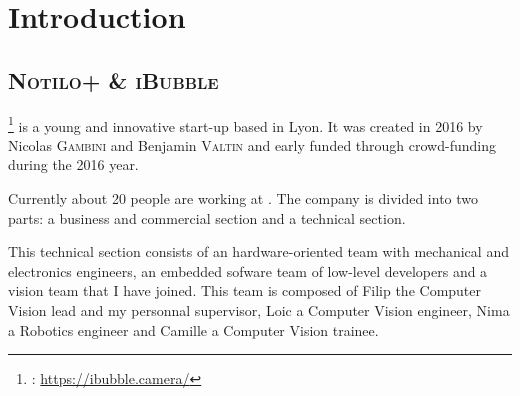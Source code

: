 
\chapter{Introduction} %

\label{Introduction} %


\newcommand{\keyword}[1]{\textbf{#1}}
\newcommand{\tabhead}[1]{\textbf{#1}}
\newcommand{\code}[1]{\texttt{\hl{#1}}}
\newcommand{\file}[1]{\texttt{\bfseries#1}}
\newcommand{\option}[1]{\texttt{\itshape#1}}
\newcommand{\iBubble}{\textsc{iBubble}}
\newcommand{\rasp}{\textsc{Raspberry Pi}}
\newcommand{\vc}{\textsc{VideoCore iv 3D}}
\newcommand{\cpu}{\textsc{arm cpu}}
\newcommand{\bcm}{\textsc{bcm2837}}
\newcommand{\qpu}{\textsc{qpu}}
\newcommand{\flow}{\textsc{optical flow}}
\newcommand{\feat}{\textsc{feature}}
\newcommand{\api}{\textsc{api}}
\newcommand{\ram}{\textsc{shared ram}}
\newcommand{\mail}{\textsc{mailbox}}
\newcommand{\uni}{\textsc{uniform}}


\section{\textsc{Notilo+} \& \textsc{iBubble}}

\footnote{\groupname{}: \url{https://ibubble.camera/}}\groupname{} is a young and innovative start-up based in Lyon. It was created in 2016 by Nicolas \textsc{Gambini} and Benjamin \textsc{Valtin} and early funded through crowd-funding during the 2016 year.

Currently about 20 people are working at \groupname{}. The company is divided into two parts: a business and commercial section and a technical section.

This technical section consists of an hardware-oriented team with mechanical and electronics engineers, an embedded sofware team of low-level developers and a vision team that I have joined. This team is composed of Filip the Computer Vision lead and my personnal supervisor, Loic a Computer Vision engineer, Nima a Robotics engineer and Camille a Computer Vision trainee.

